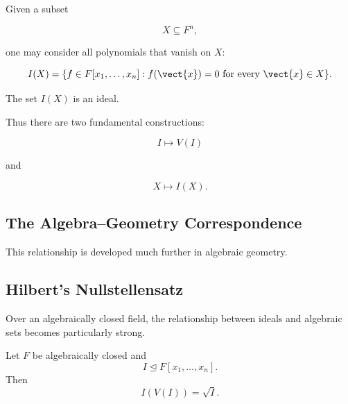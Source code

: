 Given a subset

\[ X\subseteq F^n, \]

one may consider all polynomials that vanish on \(X\):

\[ I(X)=\{f\in F[x_1,\ldots,x_n]:f(\vect{x})=0\text{ for every }\vect{x}\in X\}. \]

The set \(I(X)\) is an ideal.

Thus there are two fundamental constructions:

\[ I\longmapsto V(I) \]

and

\[ X\longmapsto I(X). \]

\subsection{The Algebra--Geometry Correspondence}
\label{subsec:algebra-geometry-correspondence}

\begin{center}
\end{center}

This relationship is developed much further in algebraic geometry.

\subsection{Hilbert's Nullstellensatz}
\label{subsec:nullstellensatz-preview}

Over an algebraically closed field, the relationship between ideals and
algebraic sets becomes particularly strong.

\begin{theorem}
Let \(F\) be algebraically closed and
\[ I\trianglelefteq F[x_1,\ldots,x_n]. \]
Then
\[ I(V(I))=\sqrt{I}. \]
\end{theorem}

